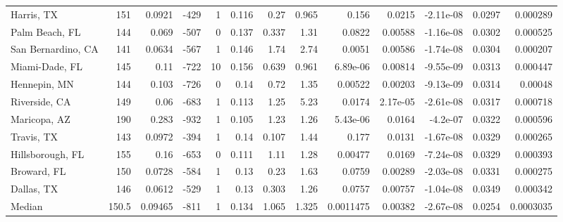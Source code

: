 \documentclass[12pt,letterpaper]{article}
\begin{document}
\begin{appendices}
\begin{sidewaystable}
{\begin{tabular}{lrrrrrrrrrrrr}
 Harris, TX         & 151   & 0.0921  &  -429 &     1 &           0.116 &            0.27  &          0.965 &    0.156     &     0.0215   &        -2.11e-08 &           0.0297  &       0.000289  \\
 Palm Beach, FL     & 144   & 0.069   &  -507 &     0 &           0.137 &            0.337 &          1.31  &    0.0822    &     0.00588  &        -1.16e-08 &           0.0302  &       0.000525  \\
 San Bernardino, CA & 141   & 0.0634  &  -567 &     1 &           0.146 &            1.74  &          2.74  &    0.0051    &     0.00586  &        -1.74e-08 &           0.0304  &       0.000207  \\
 Miami-Dade, FL     & 145   & 0.11    &  -722 &    10 &           0.156 &            0.639 &          0.961 &    6.89e-06  &     0.00814  &        -9.55e-09 &           0.0313  &       0.000447  \\
 Hennepin, MN       & 144   & 0.103   &  -726 &     0 &           0.14  &            0.72  &          1.35  &    0.00522   &     0.00203  &        -9.13e-09 &           0.0314  &       0.00048   \\
 Riverside, CA      & 149   & 0.06    &  -683 &     1 &           0.113 &            1.25  &          5.23  &    0.0174    &     2.17e-05 &        -2.61e-08 &           0.0317  &       0.000718  \\
 Maricopa, AZ       & 190   & 0.283   &  -932 &     1 &           0.105 &            1.23  &          1.26  &    5.43e-06  &     0.0164   &        -4.2e-07  &           0.0322  &       0.000596  \\
 Travis, TX         & 143   & 0.0972  &  -394 &     1 &           0.14  &            0.107 &          1.44  &    0.177     &     0.0131   &        -1.67e-08 &           0.0329  &       0.000265  \\
 Hillsborough, FL   & 155   & 0.16    &  -653 &     0 &           0.111 &            1.11  &          1.28  &    0.00477   &     0.0169   &        -7.24e-08 &           0.0329  &       0.000393  \\
 Broward, FL        & 150   & 0.0728  &  -584 &     1 &           0.13  &            0.23  &          1.63  &    0.0759    &     0.00289  &        -2.03e-08 &           0.0331  &       0.000275  \\
 Dallas, TX         & 146   & 0.0612  &  -529 &     1 &           0.13  &            0.303 &          1.26  &    0.0757    &     0.00757  &        -1.04e-08 &           0.0349  &       0.000342  \\
\hline
 Median             & 150.5 & 0.09465 &  -811 &     1 &           0.134 &            1.065 &          1.325 &    0.0011475 &     0.00382  &        -2.67e-08 &           0.0254  &       0.0003035 \\
\hline
\end{tabular}

}
\end{sidewaystable}
\end{appendices}
\end{document}
